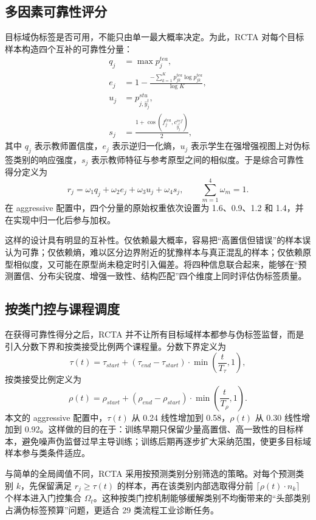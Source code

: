 \subsection{多因素可靠性评分}
目标域伪标签是否可用，不能只由单一最大概率决定。为此，RCTA 对每个目标样本构造四个互补的可靠性分量：
\begin{align}
q_j &= \max p_j^{tea},\\
e_j &= 1-\frac{-\sum_{k=1}^{K}p_{jk}^{tea}\log p_{jk}^{tea}}{\log K},\\
u_j &= p_{j,\hat{y}_j^t}^{stu},\\
s_j &= \frac{1+\cos(f_j^{tea},c_{\hat{y}_j^t}^{ref})}{2},
\end{align}
其中 $q_j$ 表示教师置信度，$e_j$ 表示逆归一化熵，$u_j$ 表示学生在强增强视图上对伪标签类别的响应强度，$s_j$ 表示教师特征与参考原型之间的相似度。于是综合可靠性得分定义为
\begin{equation}
r_j=
\omega_1 q_j+\omega_2 e_j+\omega_3 u_j+\omega_4 s_j,
\qquad
\sum_{m=1}^{4}\omega_m=1.
\end{equation}
在 aggressive 配置中，四个分量的原始权重依次设置为 1.6、0.9、1.2 和 1.4，并在实现中归一化后参与加权。

这样的设计具有明显的互补性。仅依赖最大概率，容易把“高置信但错误”的样本误认为可靠；仅依赖熵，难以区分边界附近的犹豫样本与真正混乱的样本；仅依赖原型相似度，又可能在原型尚未稳定时引入偏差。将四种信息联合起来，能够在“预测置信、分布尖锐度、增强一致性、结构匹配”四个维度上同时评估伪标签质量。

\subsection{按类门控与课程调度}
在获得可靠性得分之后，RCTA 并不让所有目标域样本都参与伪标签监督，而是引入分数下界和按类接受比例两个课程量。分数下界定义为
\begin{equation}
\tau(t)=\tau_{start}
+(\tau_{end}-\tau_{start})\cdot
\min\left(\frac{t}{T_{\tau}},1\right),
\end{equation}
按类接受比例定义为
\begin{equation}
\rho(t)=\rho_{start}
+(\rho_{end}-\rho_{start})\cdot
\min\left(\frac{t}{T_{\rho}},1\right).
\end{equation}
本文的 aggressive 配置中，$\tau(t)$ 从 0.24 线性增加到 0.58，$\rho(t)$ 从 0.30 线性增加到 0.92。这样做的目的在于：训练早期只保留少量高置信、高一致性的目标样本，避免噪声伪监督过早主导训练；训练后期再逐步扩大采纳范围，使更多目标域样本参与类条件适应。

与简单的全局阈值不同，RCTA 采用按预测类别分别筛选的策略。对每个预测类别 $k$，先保留满足 $r_j\ge \tau(t)$ 的样本，再在该类别内部选取得分前 $\lceil \rho(t)\cdot n_k\rceil$ 个样本进入门控集合 $\Omega_t$。这种按类门控机制能够缓解类别不均衡带来的“头部类别占满伪标签预算”问题，更适合 29 类流程工业诊断任务。

